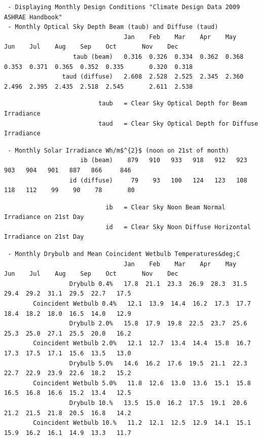 \begin{lstlisting}
 - Displaying Monthly Design Conditions "Climate Design Data 2009 ASHRAE Handbook"
 - Monthly Optical Sky Depth Beam (taub) and Diffuse (taud)
                                 Jan    Feb    Mar    Apr    May    Jun    Jul    Aug    Sep    Oct       Nov    Dec
                   taub (beam)   0.316  0.326  0.334  0.362  0.368  0.353  0.371  0.365  0.352  0.335       0.320  0.318
                taud (diffuse)   2.608  2.528  2.525  2.345  2.360  2.496  2.395  2.435  2.518  2.545       2.611  2.538
\end{lstlisting}

\begin{lstlisting}
                          taub   = Clear Sky Optical Depth for Beam Irradiance
                          taud   = Clear Sky Optical Depth for Diffuse Irradiance
\end{lstlisting}

\begin{lstlisting}
 - Monthly Solar Irradiance Wh/m$^{2}$ (noon on 21st of month)
                     ib (beam)    879   910   933   918   912   923   903   904   901   887   866     846
                  id (diffuse)     79    93   100   124   123   108   118   112    99    90    78       80
\end{lstlisting}

\begin{lstlisting}
                            ib   = Clear Sky Noon Beam Normal Irradiance on 21st Day
                            id   = Clear Sky Noon Diffuse Horizontal Irradiance on 21st Day
\end{lstlisting}

\begin{lstlisting}
 - Monthly Drybulb and Mean Coincident Wetbulb Temperatures&deg;C
                                 Jan    Feb    Mar    Apr    May    Jun    Jul    Aug    Sep    Oct       Nov    Dec
                  Drybulb 0.4%   17.8  21.1  23.3  26.9  28.3  31.5  29.4  29.2  31.1  29.5  22.7   17.5
        Coincident Wetbulb 0.4%   12.1  13.9  14.4  16.2  17.3  17.7  18.4  18.2  18.0  16.5  14.0   12.9
                  Drybulb 2.0%   15.8  17.9  19.8  22.5  23.7  25.6  25.3  25.0  27.1  25.5  20.0   16.2
        Coincident Wetbulb 2.0%   12.1  12.7  13.4  14.4  15.8  16.7  17.3  17.5  17.1  15.6  13.5   13.0
                  Drybulb 5.0%   14.6  16.2  17.6  19.5  21.1  22.3  22.7  22.9  23.9  22.6  18.2   15.2
        Coincident Wetbulb 5.0%   11.8  12.6  13.0  13.6  15.1  15.8  16.5  16.8  16.6  15.2  13.4   12.5
                  Drybulb 10.%   13.5  15.0  16.2  17.5  19.1  20.6  21.2  21.5  21.8  20.5  16.8   14.2
        Coincident Wetbulb 10.%   11.2  12.1  12.5  12.9  14.1  15.1  15.9  16.2  16.1  14.9  13.3   11.7
\end{lstlisting}

